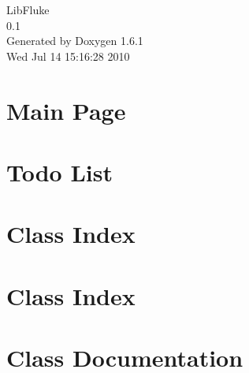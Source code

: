 \documentclass[a4paper]{book}
\begin{document}
\hypersetup{pageanchor=false}
\begin{titlepage}
\vspace*{7cm}
\begin{center}
{\Large LibFluke \\[1ex]\large 0.1 }\\
\vspace*{1cm}
{\large Generated by Doxygen 1.6.1}\\
\vspace*{0.5cm}
{\small Wed Jul 14 15:16:28 2010}\\
\end{center}
\end{titlepage}
\clearemptydoublepage
{}
\tableofcontents
\clearemptydoublepage
{}
\hypersetup{pageanchor=true}
\chapter{Main Page}
\label{index}\hypertarget{index}{}
\chapter{Todo List}
\label{todo}
\hypertarget{todo}{}

\chapter{Class Index}

\chapter{Class Index}

\chapter{Class Documentation}














\printindex
\end{document}
